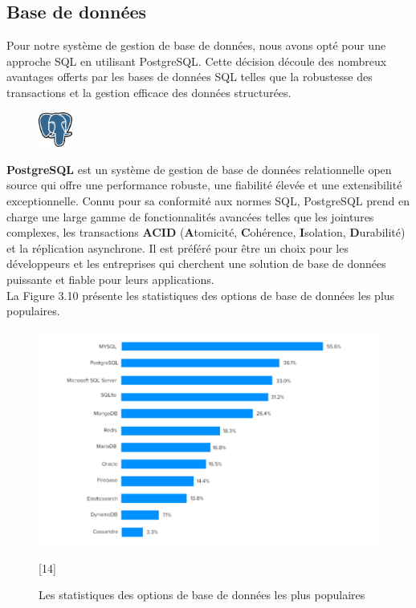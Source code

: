 \subsection{Base de données}
\noindent Pour notre système de gestion de base de données, nous avons opté pour une approche SQL en utilisant PostgreSQL. Cette décision découle des nombreux avantages offerts par les bases de données SQL telles que la robustesse des transactions et la gestion efficace des données structurées.
\vspace{0.5em}
\begin{figure}
    \vspace{-15pt}
    \includegraphics[width=0.1\textwidth]{images/chp5/postgresql.png}
\end{figure}
\textbf{PostgreSQL }est un système de gestion de base de données relationnelle open source qui offre une performance robuste, une fiabilité élevée et une extensibilité exceptionnelle. Connu pour sa conformité aux normes SQL, PostgreSQL prend en charge une large gamme de fonctionnalités avancées telles que les jointures complexes, les transactions \textbf{ACID} (\textbf{A}tomicité, \textbf{C}ohérence, \textbf{I}solation, \textbf{D}urabilité) et la réplication asynchrone. Il est préféré pour être un choix pour les développeurs et les entreprises qui cherchent une solution de base de données puissante et fiable pour leurs applications.\\
La Figure 3.10 présente les statistiques des options de base de données les plus populaires.
    \begin{figure}[H]
        \centering
        \includegraphics[width=1.2\textwidth,height=0.4\textheight]{images/chp3/fig10.png}
        \caption{Les statistiques des options de base de données les plus populaires}[14]        
        \label{fig:Les statistiques des options de base de données les plus populaires}    
    \end{figure}
    
